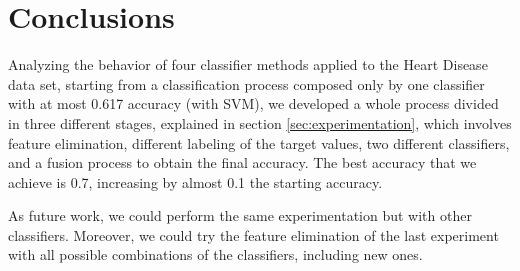 \section{Conclusions}
Analyzing the behavior of four classifier methods applied to the Heart Disease data set, starting from a classification process composed only by one classifier with at most 0.617 accuracy (with SVM), we developed a whole process divided in three different stages, explained in section \ref{sec:experimentation}, which involves feature elimination, different labeling of the target values, two different classifiers, and a fusion process to obtain the final accuracy. The best accuracy that we achieve is 0.7, increasing by almost 0.1 the starting accuracy.

As future work, we could perform the same experimentation but with other classifiers. Moreover, we could try the feature elimination of the last experiment with all possible combinations of the classifiers, including new ones.